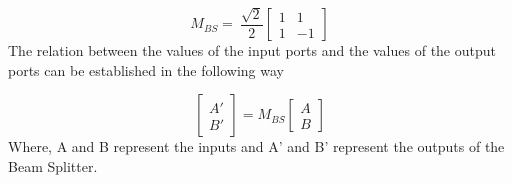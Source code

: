 \begin{equation}
M_{BS}=~\frac{\sqrt{2}}{2}\begin{bmatrix}
              					1  & 1 \\
            					1 & -1
            			  \end{bmatrix}
\end{equation}
The relation between the values of the input ports and the values of the output ports can be established in the following way

\begin{equation}
\begin{bmatrix}
A' \\
B'
\end{bmatrix}=M_{BS} \dot{}{\begin{bmatrix}
			  				     A \\
			  	                 B
			  	                 \end{bmatrix}}
\end{equation}
Where, A and B represent the inputs and A' and B' represent the outputs of the Beam Splitter.



%
%

%
%

